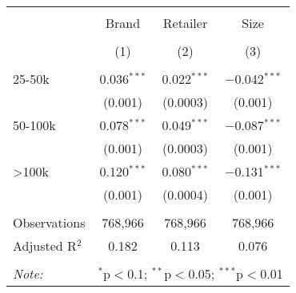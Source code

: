 
\begin{table}[!htbp] \centering 
  \caption{} 
  \label{tab:priceDecomp} 
\begin{tabular}{@{\extracolsep{5pt}}lccc} 
\\[-1.8ex]\hline 
\hline \\[-1.8ex] 
 & Brand & Retailer & Size \\ 
\\[-1.8ex] & (1) & (2) & (3)\\ 
\hline \\[-1.8ex] 
 25-50k & 0.036$^{***}$ & 0.022$^{***}$ & $-$0.042$^{***}$ \\ 
  & (0.001) & (0.0003) & (0.001) \\ 
  50-100k & 0.078$^{***}$ & 0.049$^{***}$ & $-$0.087$^{***}$ \\ 
  & (0.001) & (0.0003) & (0.001) \\ 
  >100k & 0.120$^{***}$ & 0.080$^{***}$ & $-$0.131$^{***}$ \\ 
  & (0.001) & (0.0004) & (0.001) \\ 
 \hline \\[-1.8ex] 
Observations & 768,966 & 768,966 & 768,966 \\ 
Adjusted R$^{2}$ & 0.182 & 0.113 & 0.076 \\ 
\hline 
\hline \\[-1.8ex] 
\textit{Note:}  & \multicolumn{3}{l}{$^{*}$p$<$0.1; $^{**}$p$<$0.05; $^{***}$p$<$0.01} \\ 
\end{tabular} 
\end{table} 
